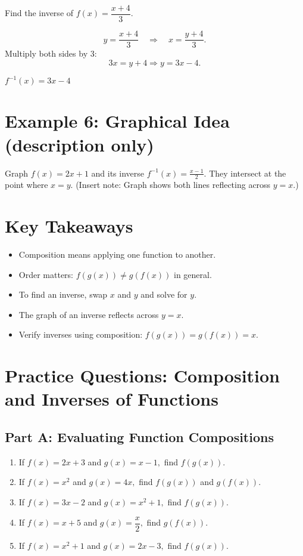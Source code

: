 \documentclass[12pt]{article}
\begin{document}
Find the inverse of \(f(x) = \dfrac{x + 4}{3}.\)

\[
y = \frac{x + 4}{3} \quad \Rightarrow \quad x = \frac{y + 4}{3}.
\]
Multiply both sides by 3:
\[
3x = y + 4 \Rightarrow y = 3x - 4.
\]

\(\boxed{f^{-1}(x) = 3x - 4}\)

\section*{Example 6: Graphical Idea (description only)}

Graph \(f(x) = 2x + 1\) and its inverse \(f^{-1}(x) = \frac{x - 1}{2}\).  
They intersect at the point where \(x = y\).  
(Insert note: Graph shows both lines reflecting across \(y = x\).)

\section*{Key Takeaways}
\begin{itemize}
  \item Composition means applying one function to another.
  \item Order matters: \(f(g(x)) \neq g(f(x))\) in general.
  \item To find an inverse, swap \(x\) and \(y\) and solve for \(y\).
  \item The graph of an inverse reflects across \(y = x\).
  \item Verify inverses using composition: \(f(g(x)) = g(f(x)) = x.\)
\end{itemize}

\newpage


\section*{Practice Questions: Composition and Inverses of Functions}

\subsection*{Part A: Evaluating Function Compositions}
\begin{enumerate}
  \item If \(f(x) = 2x + 3\) and \(g(x) = x - 1,\) find \(f(g(x))\).
  \item If \(f(x) = x^2\) and \(g(x) = 4x,\) find \(f(g(x))\) and \(g(f(x))\).
  \item If \(f(x) = 3x - 2\) and \(g(x) = x^2 + 1,\) find \(f(g(x))\).
  \item If \(f(x) = x + 5\) and \(g(x) = \dfrac{x}{2},\) find \(g(f(x))\).
  \item If \(f(x) = x^2 + 1\) and \(g(x) = 2x - 3,\) find \(f(g(x))\).
\end{enumerate}
\end{document}
